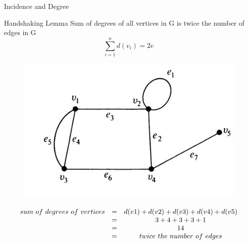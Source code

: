 \documentclass{beamer}
\begin{document}
\begin{frame}{Incidence and Degree}
\begin{block}{Handshaking Lemma}
Sum of degrees of all vertices in G is twice the number of edges in G
	$$\sum_{i=1}^{n}d(v_i)=2e$$
\end{block}
	\begin{figure}
	\includegraphics[scale=.4]{img/m17}
\end{figure}
\begin{equation*}
	\begin{array}{c c c}
		sum \ of\  degrees\  of\  vertices &=&d(v1)+d(v2)+d(v3)+ d(v4)+d(v5)\\
		&=& 3+4+3+3+1\\
		&=&14\\ &=&twice\  the\  number\  of\  edges
	\end{array}
\end{equation*}
\end{frame}
\end{document}
